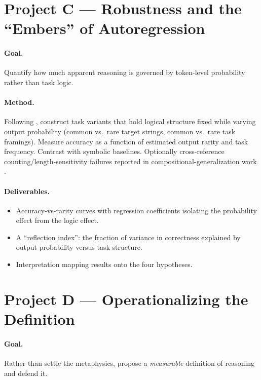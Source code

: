 \documentclass[11pt]{article}
\begin{document}
\section{Project C --- Robustness and the ``Embers'' of Autoregression}

\paragraph{Goal.} Quantify how much apparent reasoning is governed by
token-level probability rather than task logic.

\paragraph{Method.} Following \citet{mccoy2023embers}, construct task
variants that hold logical structure fixed while varying output
probability (common vs.\ rare target strings, common vs.\ rare task
framings). Measure accuracy as a function of estimated output rarity and
task frequency. Contrast with symbolic baselines. Optionally cross-reference
counting/length-sensitivity failures reported in compositional-generalization
work \citep{lake2018scan}.

\paragraph{Deliverables.}
\begin{itemize}[leftmargin=1.4em]
  \item Accuracy-vs-rarity curves with regression coefficients isolating
    the probability effect from the logic effect.
  \item A ``reflection index'': the fraction of variance in correctness
    explained by output probability versus task structure.
  \item Interpretation mapping results onto the four hypotheses.
\end{itemize}

\section{Project D --- Operationalizing the Definition}

\paragraph{Goal.} Rather than settle the metaphysics, propose a
\emph{measurable} definition of reasoning and defend it.
\end{document}
